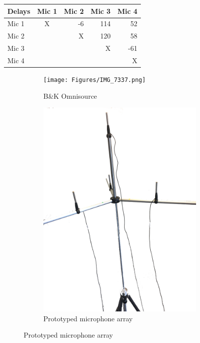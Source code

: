  
\begin{center}
  \begin{tabular}{ | l | c | r | r | r |}
    \hline
    Delays & Mic 1 & Mic 2 & Mic 3 & Mic 4 \\ \hline
    Mic 1 & X & -6&114 & 52  \\ \hline
    Mic 2 &   & X &120 & 58  \\ \hline
    Mic 3 &   &   & X  &-61  \\ \hline
    Mic 4 &   &   &    & X   \\ \hline
  \end{tabular}
\end{center}
 


\begin{figure}[H]
    \centering
    \begin{subfigure}[t]{0.5\textwidth}
    \centering
    \texttt{[image: Figures/IMG\_7337.png]}
    \caption{B\&K Omnisource}
    \label{fig:Omnisource}
\end{subfigure}%
\begin{subfigure}[t]{0.5\textwidth}
        \centering
    \includegraphics[width=0.9\textwidth]{Figures/Arraymicrophone.png}
    \caption{Prototyped microphone array}
    \label{fig:Array}
\end{subfigure}
\end{figure} 



